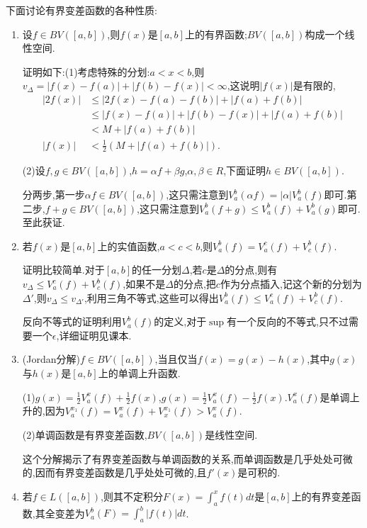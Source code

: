 \documentclass[12pt,a4paper,openany]{book}
\begin{document}
下面讨论有界变差函数的各种性质:
\begin{enumerate}
\item 设$f \in BV([a,b])$,则$f(x)$是$[a,b]$上的有界函数;$BV([a,b])$构成一个线性空间.

证明如下:(1)考虑特殊的分划:$a<x<b$,则$v_{\Delta} = |f(x)-f(a)| + |f(b)-f(x)| < \infty$,这说明$|f(x)|$是有限的,
\[
\begin{aligned}
|2f(x)|&\le|2f(x)-f(a)-f(b)| + |f(a)+f(b)|\\
&\le|f(x)-f(a)|+|f(b)-f(x)|+|f(a)+f(b)|\\
&<M+|f(a)+f(b)|\\
|f(x)|&< \frac{1}{2}(M+|f(a)+f(b)|).
\end{aligned}
\]

(2)设$f,g\in BV([a,b])$,$h=\alpha{f}+\beta{g}$,$\alpha,\beta \in R$,下面证明$h \in BV([a,b])$.

分两步,第一步$\alpha{f} \in BV([a,b])$,这只需注意到$V_{a}^{b}{(\alpha{f})}=|\alpha|V_{a}^{b}{(f)}$即可.第二步,$f+g\in BV([a,b])$,这只需注意到$V_{a}^{b}{(f+g)} \le V_{a}^{b}{(f)} + V_{a}^{b}{(g)}$即可.至此获证.

\item 若$f(x)$是$[a,b]$上的实值函数,$a<c<b$,则$V_{a}^{b}{(f)} = V_{a}^{c}{(f)} + V_{c}^{b}{(f)}$.

证明比较简单.对于$[a,b]$的任一分划$\Delta$,若$c$是$\Delta$的分点,则有$v_{\Delta} \le V_{a}^{c}(f) + V_{c}^{b}(f)$,如果不是$\Delta$的分点,把$c$作为分点插入,记这个新的分划为$\Delta'$,则$v_{\Delta}\le v_{\Delta'}$,利用三角不等式,这些可以得出$V_{a}^{b}(f)\le V_{a}^{c}(f) + V_{c}^{b}(f)$.

反向不等式的证明利用$V_{a}^{b}(f)$的定义,对于$\sup$有一个反向的不等式,只不过需要一个$\epsilon$,详细证明见课本.

\item (Jordan分解)$f \in BV([a,b])$,当且仅当$f(x)=g(x)-h(x)$,其中$g(x)$与$h(x)$是$[a,b]$上的单调上升函数.

(1)$g(x)=\frac{1}{2}V_{a}^{x}(f) + \frac{1}{2}f(x)$,$g(x)=\frac{1}{2}V_{a}^{x}(f) - \frac{1}{2}f(x)$.$V_{a}^{x}(f)$是单调上升的,因为$V_{a}^{x_1}(f) = V_{a}^{x}(f) + V_{x}^{x_1}(f) > V_{a}^{x}(f)$.

(2)单调函数是有界变差函数,$BV([a,b])$是线性空间.

这个分解揭示了有界变差函数与单调函数的关系,而单调函数是几乎处处可微的,因而有界变差函数是几乎处处可微的,且$f'(x)$是可积的.

\item 若$f\in L([a,b])$,则其不定积分$F(x)=\int_{a}^{x}{f(t)dt}$是$[a,b]$上的有界变差函数,其全变差为$V_{a}^{b}(F) = \int_{a}^{b}{|f(t)|dt}$.


\end{enumerate}
\end{document}
